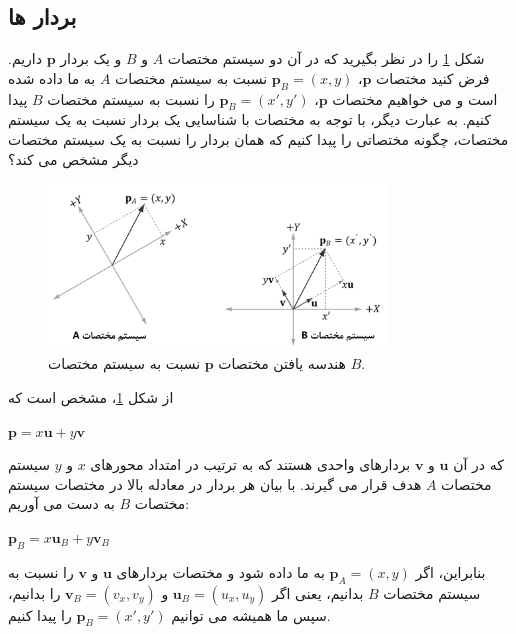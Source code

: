 \subsection{\textbf{بردار ها}}
{
    \Large
    \begin{spacing}{1.5}
        شکل \ref{fig:4.Session.1.3.11} را در نظر بگیرید که در آن دو سیستم مختصات $A$ و $B$ و یک بردار $\textbf{p}$ داریم.
        فرض کنید مختصات $\textbf{p}$، $\textbf{p}_{B}=(x, y)$ نسبت به سیستم مختصات $A$ به ما داده شده است
        و می خواهیم مختصات $\textbf{p}$، $\textbf{p}_{B}=(x\prime, y\prime)$ را نسبت به سیستم مختصات $B$ پیدا کنیم.
        به عبارت دیگر، با توجه به مختصات با شناسایی یک بردار نسبت به یک سیستم مختصات، چگونه مختصاتی را پیدا کنیم که همان بردار را نسبت به یک سیستم مختصات دیگر مشخص می کند؟

        \begin{figure}[H]
            \centering
            \setlength{\belowcaptionskip}{-10pt}
            \includegraphics[width=0.8\textwidth]{Images/4/3/4.Session.1.3.11}
            \caption {هندسه یافتن مختصات $\textbf{p}$ نسبت به سیستم مختصات $B$.}
            \label{fig:4.Session.1.3.11}
        \end{figure}

        از شکل \ref{fig:4.Session.1.3.11}، مشخص است که

        \begin{center}
            $\textbf{p}=x\textbf{u}+y\textbf{v}$
        \end{center}

        که در آن $\textbf{u}$ و $\textbf{v}$ بردارهای واحدی هستند که به ترتیب در امتداد محورهای $x$ و $y$ سیستم مختصات $A$ هدف قرار می گیرند.
        با بیان هر بردار در معادله بالا در مختصات سیستم مختصات $B$ به دست می آوریم:

        \begin{center}
            $\textbf{p}_{B}=x\textbf{u}_{B}+y\textbf{v}_{B}$
        \end{center}

        بنابراین، اگر $\textbf{p}_{A}=(x, y)$ به ما داده شود و مختصات بردارهای $\textbf{u}$ و $\textbf{v}$ را نسبت به سیستم مختصات $B$ بدانیم،
        یعنی اگر $\textbf{u}_{B}=(u_{x}, u_{y})$ و $\textbf{v}_{B}=(v_{x}, v_{y})$ را بدانیم، سپس ما همیشه می توانیم $\textbf{p}_{B}=(x\prime, y\prime)$ را پیدا کنیم.


\end{spacing}}
